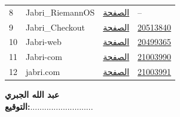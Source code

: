 \documentclass[a4paper,11pt]{article}
\begin{document}
\begin{otherlanguage}{arabic}
\begin{longtable}{>{\raggedright}p{1.2cm} >{\raggedright}p{3.5cm} >{\raggedright}p{3.5cm} >{\raggedright}p{3.5cm}}
8 & Jabri\_RiemannOS & \href{https://jabri-web.github.io/Jabri-RiemannOS/}{الصفحة} & -- \\
9 & Jabri\_Checkout & \href{https://jabri-web.github.io/Jabri_Checkout/}{الصفحة} & \href{https://doi.org/10.5281/zenodo.20513840}{20513840} \\
10 & Jabri-web & \href{https://jabri-web.github.io/Jabri-web/}{الصفحة} & \href{https://doi.org/10.5281/zenodo.20499365}{20499365} \\
11 & Jabri-com & \href{https://jabri-web.github.io/jabri-com/}{الصفحة} & \href{https://doi.org/10.5281/zenodo.21003990}{21003990} \\
12 & jabri.com & \href{https://jabri-web.github.io/jabri/}{الصفحة} & \href{https://doi.org/10.5281/zenodo.21003991}{21003991} \\

\end{longtable}

\vspace{1cm}
\begin{flushleft}
\textbf{عبد الله الجبري} \\
\textbf{التوقيع:}...........................
\end{flushleft}

\end{otherlanguage}
\end{document}
